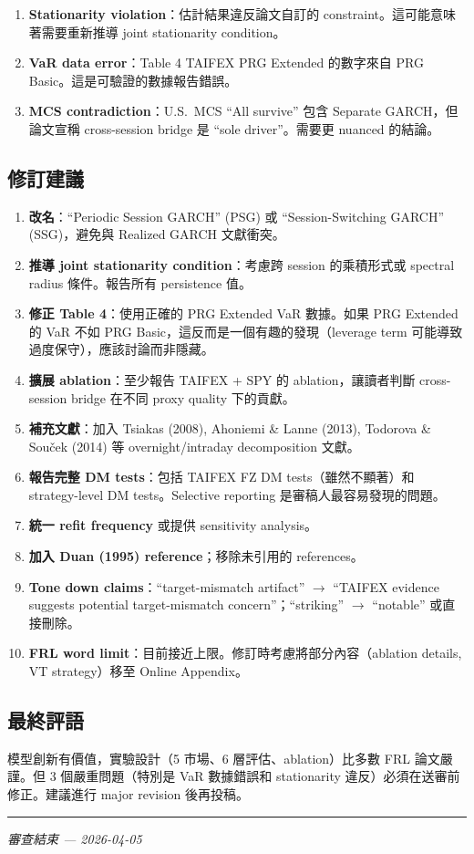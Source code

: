 \documentclass[12pt,a4paper]{article}
\begin{document}
\begin{enumerate}
    \item \textbf{Stationarity violation}：估計結果違反論文自訂的 constraint。這可能意味著需要重新推導 joint stationarity condition。
    \item \textbf{VaR data error}：Table 4 TAIFEX PRG Extended 的數字來自 PRG Basic。這是可驗證的數據報告錯誤。
    \item \textbf{MCS contradiction}：U.S.\ MCS ``All survive'' 包含 Separate GARCH，但論文宣稱 cross-session bridge 是 ``sole driver''。需要更 nuanced 的結論。
\end{enumerate}

\subsection*{修訂建議}

\begin{enumerate}
    \item \textbf{改名}：``Periodic Session GARCH'' (PSG) 或 ``Session-Switching GARCH'' (SSG)，避免與 Realized GARCH 文獻衝突。
    \item \textbf{推導 joint stationarity condition}：考慮跨 session 的乘積形式或 spectral radius 條件。報告所有 persistence 值。
    \item \textbf{修正 Table 4}：使用正確的 PRG Extended VaR 數據。如果 PRG Extended 的 VaR 不如 PRG Basic，這反而是一個有趣的發現（leverage term 可能導致過度保守），應該討論而非隱藏。
    \item \textbf{擴展 ablation}：至少報告 TAIFEX + SPY 的 ablation，讓讀者判斷 cross-session bridge 在不同 proxy quality 下的貢獻。
    \item \textbf{補充文獻}：加入 Tsiakas (2008), Ahoniemi \& Lanne (2013), Todorova \& Souček (2014) 等 overnight/intraday decomposition 文獻。
    \item \textbf{報告完整 DM tests}：包括 TAIFEX FZ DM tests（雖然不顯著）和 strategy-level DM tests。Selective reporting 是審稿人最容易發現的問題。
    \item \textbf{統一 refit frequency} 或提供 sensitivity analysis。
    \item \textbf{加入 Duan (1995) reference}；移除未引用的 references。
    \item \textbf{Tone down claims}：``target-mismatch artifact'' $\to$ ``TAIFEX evidence suggests potential target-mismatch concern''；``striking'' $\to$ ``notable'' 或直接刪除。
    \item \textbf{FRL word limit}：目前接近上限。修訂時考慮將部分內容（ablation details, VT strategy）移至 Online Appendix。
\end{enumerate}

\subsection*{最終評語}

模型創新有價值，實驗設計（5 市場、6 層評估、ablation）比多數 FRL 論文嚴謹。但 3 個嚴重問題（特別是 VaR 數據錯誤和 stationarity 違反）必須在送審前修正。建議進行 major revision 後再投稿。

\bigskip
\hrule
\bigskip
\begin{center}
\textit{審查結束 --- 2026-04-05}
\end{center}
\end{document}

